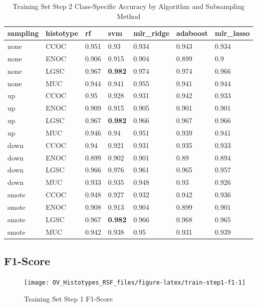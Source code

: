 \documentclass[
]{report}
\begin{document}
\begin{table}

\caption{\label{tab:train-step2-accuracy-class-table}Training Set Step 2 Class-Specific Accuracy by Algorithm and Subsampling Method}
\centering
\begin{tabular}[t]{l|l|l|l|l|l|l}
\hline
sampling & histotype & rf & svm & mlr\_ridge & adaboost & mlr\_lasso\\
\hline
none & CCOC & 0.951 & 0.93 & 0.934 & 0.943 & 0.934\\
\hline
none & ENOC & 0.906 & 0.915 & 0.904 & 0.899 & 0.9\\
\hline
none & LGSC & 0.967 & \textbf{0.982} & 0.974 & 0.974 & 0.966\\
\hline
none & MUC & 0.944 & 0.941 & 0.955 & 0.941 & 0.944\\
\hline
up & CCOC & 0.95 & 0.928 & 0.931 & 0.942 & 0.933\\
\hline
up & ENOC & 0.909 & 0.915 & 0.905 & 0.901 & 0.901\\
\hline
up & LGSC & 0.967 & \textbf{0.982} & 0.966 & 0.967 & 0.966\\
\hline
up & MUC & 0.946 & 0.94 & 0.951 & 0.939 & 0.941\\
\hline
down & CCOC & 0.94 & 0.921 & 0.931 & 0.935 & 0.933\\
\hline
down & ENOC & 0.899 & 0.902 & 0.901 & 0.89 & 0.894\\
\hline
down & LGSC & 0.966 & 0.976 & 0.961 & 0.965 & 0.957\\
\hline
down & MUC & 0.933 & 0.935 & 0.948 & 0.93 & 0.926\\
\hline
smote & CCOC & 0.948 & 0.927 & 0.932 & 0.942 & 0.936\\
\hline
smote & ENOC & 0.908 & 0.913 & 0.904 & 0.899 & 0.901\\
\hline
smote & LGSC & 0.967 & \textbf{0.982} & 0.966 & 0.968 & 0.965\\
\hline
smote & MUC & 0.942 & 0.938 & 0.95 & 0.931 & 0.939\\
\hline
\end{tabular}
\end{table}

\hypertarget{f1-score-1}{%
\subsection{F1-Score}\label{f1-score-1}}

\begin{figure}[H]

{\centering \texttt{[image: OV\_Histotypes\_RSF\_files/figure-latex/train-step1-f1-1]} 

}

\caption{Training Set Step 1 F1-Score}\label{fig:train-step1-f1}
\end{figure}
\end{document}
